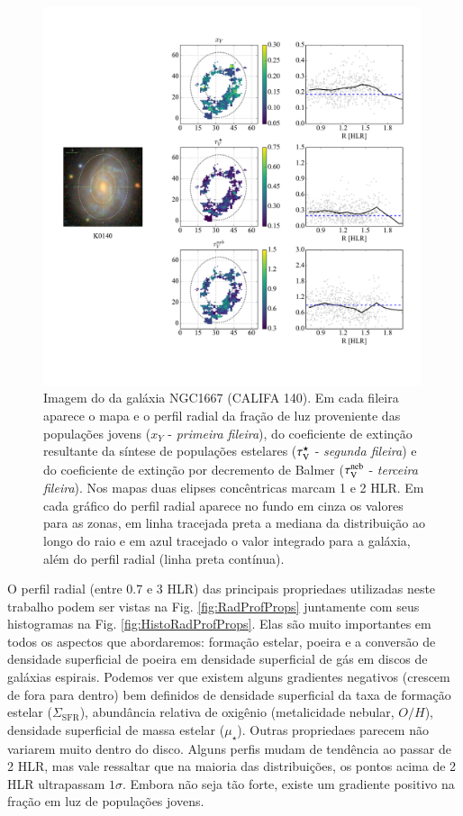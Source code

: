 \begin{figure}
	\centering
	\includegraphics[width=0.99\textwidth]{figuras/K0140_xY_radialProfile_realsample.pdf}
	\caption[Imagem e exemplos de mapas e perfis radiais.]
	{Imagem do \SDSS da galáxia NGC1667 (CALIFA 140). Em cada fileira aparece o mapa e o perfil radial
da fração de luz proveniente das populações jovens ($x_Y$ - \emph{primeira fileira}), do
coeficiente de extinção resultante da síntese de populações estelares ($\tau_{\mathrm{V}}^\star$ - \emph{segunda
fileira}) e do coeficiente de extinção por decremento de Balmer ($\tau_{\mathrm{V}}^{\mathrm{neb}}$ - \emph{terceira
fileira}). Nos mapas duas elipses concêntricas marcam 1 e 2 HLR. Em cada gráfico do perfil radial
aparece no fundo em cinza os valores para as zonas, em linha tracejada preta a mediana da
distribuição ao longo do raio e em azul tracejado o valor integrado para a galáxia, além do perfil
radial (linha preta contínua).}
	\label{fig:K0140xYRadProf}
\end{figure}

O perfil radial (entre 0.7 e 3 HLR) das principais propriedaes utilizadas neste trabalho podem ser
vistas na Fig. \ref{fig:RadProfProps} juntamente com seus histogramas na Fig.
\ref{fig:HistoRadProfProps}. Elas são muito importantes em todos os aspectos que abordaremos:
formação estelar, poeira e a conversão de densidade superficial de poeira em densidade superficial
de gás em discos de galáxias espirais. Podemos ver que existem alguns gradientes negativos (crescem
de fora para dentro) bem definidos de densidade superficial da taxa de formação estelar
($\Sigma_{\mathrm{SFR}}$), abundância relativa de oxigênio (metalicidade nebular, $O/H$), densidade
superficial de massa estelar ($\mu_\star$). Outras propriedaes parecem não variarem muito dentro do
disco. Alguns perfis mudam de tendência ao passar de 2 HLR, mas vale ressaltar que na maioria das
distribuições, os pontos acima de 2 HLR ultrapassam $1\sigma$. Embora não seja tão forte, existe um
gradiente positivo na fração em luz de populações jovens. 

